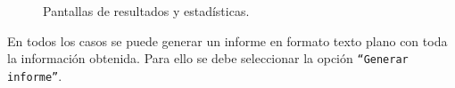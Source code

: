 \begin{figure}[h]
{	}
	\hspace{1cm}
	\caption{Pantallas de resultados y estadísticas.}
	\label{fig:ventana_estadisticas}
\end{figure}

En todos los casos se puede generar un informe en formato texto plano con toda la información obtenida.
Para ello se debe seleccionar la opción \texttt{``Generar informe''}.









